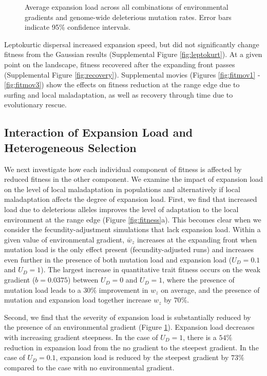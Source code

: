 \begin{figure}[h]
\centering
{}
\caption[~- Average expansion load.]{Average expansion load across all combinations of environmental gradients and genome-wide deleterious mutation rates. Error bars indicate 95\% confidence intervals.}
\label{fig:load}
\end{figure}


Leptokurtic dispersal increased expansion speed, but did not significantly change fitness from the Gaussian results (Supplemental Figure \ref{fig:leptokurt}). At a given point on the landscape, fitness recovered after the expanding front passes (Supplemental Figure \ref{fig:recovery}). Supplemental movies (Figures \ref{fig:fitmov1} - \ref{fig:fitmov3}) show the effects on fitness reduction at the range edge due to surfing and local maladaptation, as well as recovery through time due to evolutionary rescue.

\subsection{Interaction of Expansion Load and Heterogeneous Selection}

We next investigate how each individual component of fitness is affected by reduced fitness in the other component. We examine the impact of expansion load on the level of local maladaptation in populations and alternatively if local maladaptation affects the degree of expansion load. First, we find that increased load due to deleterious alleles improves the level of adaptation to the local environment at the range edge (Figure \ref{fig:fitness}a). This becomes clear when we consider the fecundity-adjustment simulations that lack expansion load. Within a given value of environmental gradient, $\bar{w}_z$ increases at the expanding front when mutation load is the only effect present (fecundity-adjusted runs) and increases even further in the presence of both mutation load and expansion load  ($U_D = 0.1$ and $U_D = 1$). The largest increase in quantitative trait fitness occurs on the weak gradient ($b = 0.0375$) between $U_D = 0$ and $U_D = 1$, where the presence of mutation load leads to a $30\%$ improvement in $w_z$ on average, and the presence of mutation and expansion load together increase $w_z$ by $70\%$. 

Second, we find that the severity of expansion load is substantially reduced by the presence of an environmental gradient (Figure \ref{fig:load}). Expansion load decreases with increasing gradient steepness. In the case of $U_D = 1$, there is a $54\%$ reduction in expansion load from the no gradient to the steepest gradient. In the case of $U_D = 0.1$, expansion load is reduced by the steepest gradient by $73\%$ compared to the case with no environmental gradient. 


